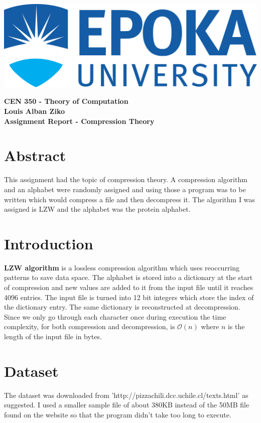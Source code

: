 \documentclass[]{article}
\newcommand\tab[1][1cm]{\hspace*{#1}}
\begin{document}
\includegraphics[scale=0.1]{res/epoka.png}
\begin{center}
	\begin{large}
		\textbf{
		CEN 350 - Theory of Computation\\
		Louis Alban Ziko\\
		Assignment Report - Compression Theory\\
		}
	\end{large}
\end{center}

\section{Abstract}
\tab This assignment had the topic of compression theory.
A compression algorithm and an alphabet were randomly assigned
and using those a program was to be written which would compress
a file and then decompress it. The algorithm I
was assigned is LZW and the alphabet was the protein alphabet.

\section{Introduction}
\tab \textbf{LZW algorithm} is a lossless compression algorithm which uses
reoccurring patterns to save data space. The alphabet is stored into a 
dictionary at the start of compression and new values are added to it 
from the input file until it reaches 4096 entries. The input file is 
turned into 12 bit integers which store the index of the dictionary entry.
The same dictionary is reconstructed at decompression.\\
\tab Since we only go through each character once during execution
the time complexity, for both compression and decompression, is 
$\mathcal{O}(n)$ where $n$ is the length of the input file in bytes.

\section{Dataset}
\tab The dataset was downloaded from 'http://pizzachili.dcc.uchile.cl/texts.html'
as suggested. I used a smaller sample file of about 380KB instead of the
50MB file found on the website so that the program didn't take too long to execute.
\end{document}
